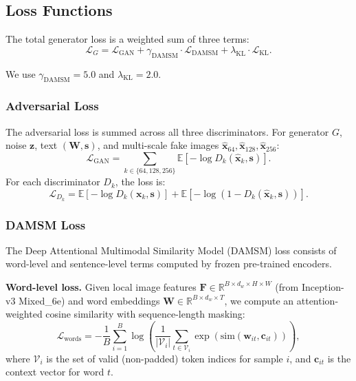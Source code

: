 \documentclass[conference]{IEEEtran}
\begin{document}
\subsection{Loss Functions}
\label{sec:losses}

The total generator loss is a weighted sum of three terms:
\begin{equation}
    \mathcal{L}_G = \mathcal{L}_{\text{GAN}} + \gamma_{\text{DAMSM}} \cdot \mathcal{L}_{\text{DAMSM}} + \lambda_{\text{KL}} \cdot \mathcal{L}_{\text{KL}}.
\end{equation}

We use $\gamma_{\text{DAMSM}} = 5.0$ and $\lambda_{\text{KL}} = 2.0$.

\subsubsection{Adversarial Loss}
The adversarial loss is summed across all three discriminators. For generator $G$, noise $\mathbf{z}$, text $(\mathbf{W}, \mathbf{s})$, and multi-scale fake images $\hat{\mathbf{x}}_{64}, \hat{\mathbf{x}}_{128}, \hat{\mathbf{x}}_{256}$:
\begin{equation}
    \mathcal{L}_{\text{GAN}} = \sum_{k \in \{64,128,256\}} \mathbb{E}\left[ -\log D_k(\hat{\mathbf{x}}_k, \mathbf{s}) \right].
\end{equation}
For each discriminator $D_k$, the loss is:
\begin{equation}
    \mathcal{L}_{D_k} = \mathbb{E}\left[ -\log D_k(\mathbf{x}_k, \mathbf{s}) \right] + \mathbb{E}\left[ -\log(1 - D_k(\hat{\mathbf{x}}_k, \mathbf{s})) \right].
\end{equation}

\subsubsection{DAMSM Loss}
The Deep Attentional Multimodal Similarity Model (DAMSM) loss consists of word-level and sentence-level terms computed by frozen pre-trained encoders.

\textbf{Word-level loss.} Given local image features $\mathbf{F} \in \mathbb{R}^{B \times d_w \times H \times W}$ (from Inception-v3 Mixed\_6e) and word embeddings $\mathbf{W} \in \mathbb{R}^{B \times d_w \times T}$, we compute an attention-weighted cosine similarity with sequence-length masking:
\begin{equation}
    \mathcal{L}_{\text{words}} = -\frac{1}{B} \sum_{i=1}^{B} \log \left( \frac{1}{|\mathcal{V}_i|} \sum_{t \in \mathcal{V}_i} \exp(\text{sim}(\mathbf{w}_{it}, \mathbf{c}_{it})) \right),
\end{equation}
where $\mathcal{V}_i$ is the set of valid (non-padded) token indices for sample $i$, and $\mathbf{c}_{it}$ is the context vector for word $t$.
\end{document}

